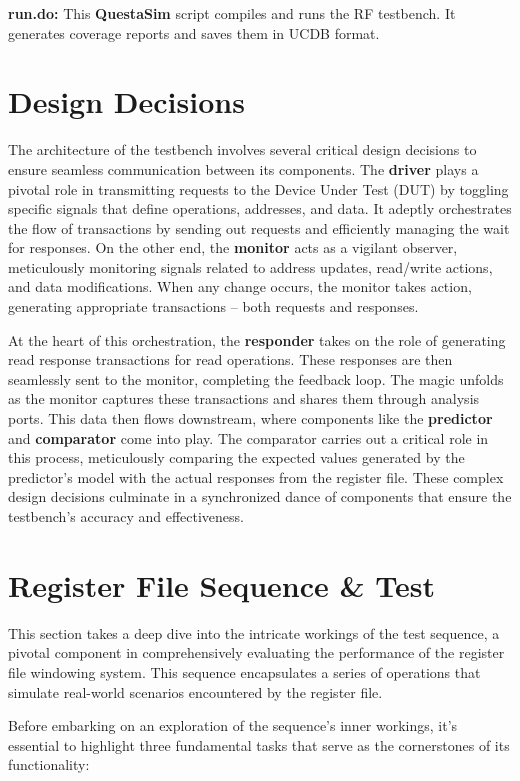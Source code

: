 \documentclass[12pt,a4paper]{report}
\begin{document}
\vspace*{0.3cm}

\textbf{run.do:} This \textbf{QuestaSim} script compiles and runs the RF testbench. It generates coverage reports and saves them in UCDB format.

\section{Design Decisions}
The architecture of the testbench involves several critical design decisions to ensure seamless communication between its components. The \textbf{driver} plays a pivotal role in transmitting requests to the Device Under Test (DUT) by toggling specific signals that define operations, addresses, and data. It adeptly orchestrates the flow of transactions by sending out requests and efficiently managing the wait for responses. On the other end, the \textbf{monitor} acts as a vigilant observer, meticulously monitoring signals related to address updates, read/write actions, and data modifications. When any change occurs, the monitor takes action, generating appropriate transactions – both requests and responses.

At the heart of this orchestration, the \textbf{responder} takes on the role of generating read response transactions for read operations. These responses are then seamlessly sent to the monitor, completing the feedback loop. The magic unfolds as the monitor captures these transactions and shares them through analysis ports. This data then flows downstream, where components like the \textbf{predictor} and \textbf{comparator} come into play. The comparator carries out a critical role in this process, meticulously comparing the expected values generated by the predictor's model with the actual responses from the register file. These complex design decisions culminate in a synchronized dance of components that ensure the testbench's accuracy and effectiveness.

\section{Register File Sequence \& Test}
This section takes a deep dive into the intricate workings of the test sequence, a pivotal component in comprehensively evaluating the performance of the register file windowing system. This sequence encapsulates a series of operations that simulate real-world scenarios encountered by the register file.

Before embarking on an exploration of the sequence's inner workings, it's essential to highlight three fundamental tasks that serve as the cornerstones of its functionality:
\end{document}
